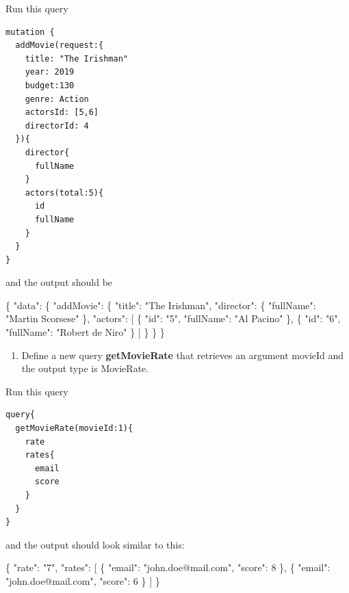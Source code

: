 \documentclass[]{book}
\newenvironment{Shaded}{\begin{snugshade}}{\end{snugshade}}
\newcommand{\DataTypeTok}[1]{\textcolor[rgb]{0.13,0.29,0.53}{#1}}
\newcommand{\DecValTok}[1]{\textcolor[rgb]{0.00,0.00,0.81}{#1}}
\newcommand{\StringTok}[1]{\textcolor[rgb]{0.31,0.60,0.02}{#1}}
\newcommand{\OtherTok}[1]{\textcolor[rgb]{0.56,0.35,0.01}{#1}}
\newcommand{\FunctionTok}[1]{\textcolor[rgb]{0.00,0.00,0.00}{#1}}
\providecommand{\tightlist}{%
  \setlength{\itemsep}{0pt}\setlength{\parskip}{0pt}}
\begin{document}
Run this query

\begin{verbatim}
mutation {
  addMovie(request:{
    title: "The Irishman"
    year: 2019
    budget:130
    genre: Action
    actorsId: [5,6]
    directorId: 4
  }){
    director{
      fullName
    }
    actors(total:5){
      id
      fullName
    }
  }
}
\end{verbatim}

and the output should be

\begin{Shaded}
\begin{Highlighting}[]
\FunctionTok{\{}
  \DataTypeTok{"data"}\FunctionTok{:} \FunctionTok{\{}
    \DataTypeTok{"addMovie"}\FunctionTok{:} \FunctionTok{\{}
      \DataTypeTok{"title"}\FunctionTok{:} \StringTok{"The Irishman"}\FunctionTok{,}
      \DataTypeTok{"director"}\FunctionTok{:} \FunctionTok{\{}
        \DataTypeTok{"fullName"}\FunctionTok{:} \StringTok{"Martin Scorsese"}
      \FunctionTok{\},}
      \DataTypeTok{"actors"}\FunctionTok{:} \OtherTok{[}
        \FunctionTok{\{}
          \DataTypeTok{"id"}\FunctionTok{:} \StringTok{"5"}\FunctionTok{,}
          \DataTypeTok{"fullName"}\FunctionTok{:} \StringTok{"Al Pacino"}
        \FunctionTok{\}}\OtherTok{,}
        \FunctionTok{\{}
          \DataTypeTok{"id"}\FunctionTok{:} \StringTok{"6"}\FunctionTok{,}
          \DataTypeTok{"fullName"}\FunctionTok{:} \StringTok{"Robert de Niro"}
        \FunctionTok{\}}
      \OtherTok{]}
    \FunctionTok{\}}
  \FunctionTok{\}}
\FunctionTok{\}}
\end{Highlighting}
\end{Shaded}

\begin{enumerate}
\def\labelenumi{\arabic{enumi}.}
\setcounter{enumi}{4}
\tightlist
\item
  Define a new query \textbf{getMovieRate} that retrieves an argument
  movieId and the output type is MovieRate.
\end{enumerate}

Run this query

\begin{verbatim}
query{
  getMovieRate(movieId:1){
    rate
    rates{
      email
      score
    }
  }
}
\end{verbatim}

and the output should look similar to this:

\begin{Shaded}
\begin{Highlighting}[]
\FunctionTok{\{}
  \DataTypeTok{"rate"}\FunctionTok{:} \StringTok{"7"}\FunctionTok{,}
  \DataTypeTok{"rates"}\FunctionTok{:} \OtherTok{[}
    \FunctionTok{\{}
      \DataTypeTok{"email"}\FunctionTok{:} \StringTok{"john.doe@mail.com"}\FunctionTok{,}
      \DataTypeTok{"score"}\FunctionTok{:} \DecValTok{8}
    \FunctionTok{\}}\OtherTok{,}
    \FunctionTok{\{}
      \DataTypeTok{"email"}\FunctionTok{:} \StringTok{"john.doe@mail.com"}\FunctionTok{,}
      \DataTypeTok{"score"}\FunctionTok{:} \DecValTok{6}
    \FunctionTok{\}}
  \OtherTok{]}
\FunctionTok{\}}
\end{Highlighting}
\end{Shaded}
\end{document}
